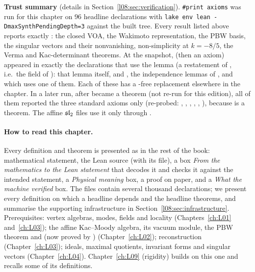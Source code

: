 \begin{status}
\textbf{Trust summary} (details in Section~\ref{l08:sec:verification}). \texttt{\#print axioms} was
run for this chapter on 96 headline declarations with
\texttt{lake env lean -DmaxSynthPendingDepth=3} against the built tree. Every result listed above
reports exactly \lean{[propext, Classical.}\allowbreak{}\allowbreak\lean{sound]}: the closed VOA, the Wakimoto
representation, the PBW basis, the singular vectors and their nonvanishing, non-simplicity at
$k=-8/5$, the Verma and Kac-determinant theorems. At the snapshot,  (then an axiom) appeared in exactly
the declarations that use the lemma \allowbreak{}\allowbreak{}\allowbreak{} (a restatement of
\allowbreak{}\allowbreak{}\allowbreak{}, i.e.\ the field  of ): that lemma
itself, \allowbreak{}\allowbreak{}\allowbreak{}\allowbreak{}\allowbreak{} and \allowbreak{}\allowbreak{}\allowbreak{}, the
independence lemmas of , and  which
uses one of them. Each of these has a -free replacement elsewhere in the chapter. In
a later run, after  became a theorem (not re-run for this edition), all of them reported the three standard axioms only (re-probed: ,
, , ,
, ), because  is a theorem. The affine
$\mathfrak{sl}_2$ files use it only through .
\end{status}

\paragraph{How to read this chapter.}
Every definition and theorem is presented as in the rest of the book: mathematical statement, the
Lean source (with its file), a box \emph{From the mathematics to the Lean statement} that decodes it
and checks it against the intended statement, a \emph{Physical meaning} box, a proof on paper, and a
\emph{What the machine verified} box. The files contain several thousand declarations; we present
every definition on which a headline depends and the headline theorems, and summarise the
supporting infrastructure in Section~\ref{l08:sec:infrastructure}. Prerequisites: vertex
algebras, modes, fields and locality (Chapters~\ref{ch:L01} and~\ref{ch:L03}); the affine Kac--Moody algebra, its vacuum
module, the PBW theorem  and  (now proved by ) (Chapter~\ref{ch:L02});
reconstruction (Chapter~\ref{ch:L03}); ideals, maximal quotients, invariant forms and singular
vectors (Chapter~\ref{ch:L04}). Chapter~\ref{ch:L09} (rigidity) builds on this one and recalls some
of its definitions.

